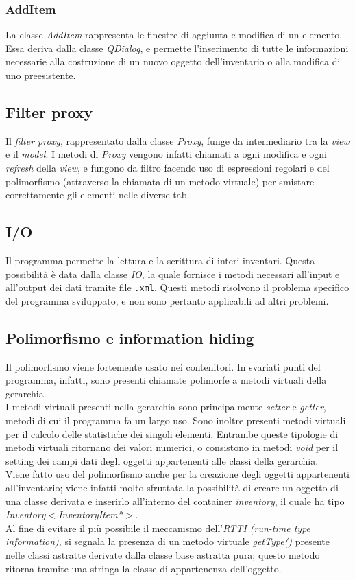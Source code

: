 \subsubsection{AddItem}
La classe \textit{AddItem} rappresenta le finestre di aggiunta e modifica di un elemento. Essa deriva dalla classe \textit{QDialog}, e permette l'inserimento di tutte le informazioni necessarie alla costruzione di un nuovo oggetto dell'inventario o alla modifica di uno preesistente.

\subsection{Filter proxy}
Il \textit{filter proxy}, rappresentato dalla classe \textit{Proxy}, funge da intermediario tra la \textit{view} e il \textit{model}. I metodi di \textit{Proxy} vengono infatti chiamati a ogni modifica e ogni \textit{refresh} della \textit{view}, e fungono da filtro facendo uso di espressioni regolari e del polimorfismo (attraverso la chiamata di un metodo virtuale) per smistare correttamente gli elementi nelle diverse tab.

\subsection{I/O}
Il programma permette la lettura e la scrittura di interi inventari. Questa possibilità è data dalla classe \textit{IO}, la quale fornisce i metodi necessari all'input e all'output dei dati tramite file \texttt{.xml}. Questi metodi risolvono il problema specifico del programma sviluppato, e non sono pertanto applicabili ad altri problemi.

\subsection{Polimorfismo e information hiding}
Il polimorfismo viene fortemente usato nei contenitori. In svariati punti del programma, infatti, sono presenti chiamate polimorfe a metodi virtuali della gerarchia. \\
I metodi virtuali presenti nella gerarchia sono principalmente \textit{setter} e \textit{getter}, metodi di cui il programma fa un largo uso. Sono inoltre presenti metodi virtuali per il calcolo delle statistiche dei singoli elementi. Entrambe queste tipologie di metodi virtuali ritornano dei valori numerici, o consistono in metodi \textit{void} per il setting dei campi dati degli oggetti appartenenti alle classi della gerarchia. \\
Viene fatto uso del polimorfismo anche per la creazione degli oggetti appartenenti all'inventario; viene infatti molto sfruttata la possibilità di creare un oggetto di una classe derivata e inserirlo all'interno del container \textit{inventory}, il quale ha tipo \textit{Inventory$<$InventoryItem*$>$}. \\
Al fine di evitare il più possibile il meccanismo dell'\textit{RTTI (run-time type information)}, si segnala la presenza di un metodo virtuale \textit{getType()} presente nelle classi astratte derivate dalla classe base astratta pura; questo metodo ritorna tramite una stringa la classe di appartenenza dell'oggetto.

